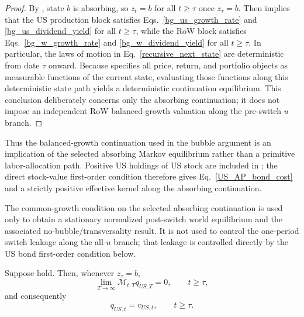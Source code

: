 \documentclass{article}
\def\green#1{#1}%
\begin{document}
\begin{proof}
By , state $b$ is absorbing, so $z_t=b$ for all $t\ge \tau$ once $z_\tau=b$. Then  implies that the US production block satisfies Eqs.~\eqref{bg_us_growth_rate} and \eqref{bg_us_dividend_yield} for all $t\ge \tau$, while the RoW block satisfies Eqs.~\eqref{bg_w_growth_rate} and \eqref{bg_w_dividend_yield} for all $t\ge \tau$. In particular, the laws of motion in Eq.~\eqref{recursive_next_state} are deterministic from date $\tau$ onward. Because  specifies all price, return, and portfolio objects as measurable functions of the current state, evaluating those functions along this deterministic state path yields a deterministic continuation equilibrium. This conclusion deliberately concerns only the absorbing continuation; it does not impose an independent RoW balanced-growth valuation along the pre-switch $u$ branch.
\end{proof}

Thus the balanced-growth continuation used in the bubble argument is an implication of the selected absorbing Markov equilibrium rather than a primitive labor-allocation path.  \green{Positive US holdings of US stock} are \green{included in }; the \green{direct stock-value first-order condition therefore gives} Eq.~\green{\eqref{US_AP_bond_cost} and a strictly positive effective} kernel along the absorbing continuation.

\green{The common-growth condition on the selected absorbing continuation is used only to obtain a stationary normalized post-switch world equilibrium and the associated no-bubble/transversality result}.  \green{It is not used to control the one-period switch leakage along the all-}$\green{u}$ \green{branch}; \green{that leakage is controlled directly by the US bond first-order condition below}.

\begin{prop}\label{prop_no_bubble_absorbing_branch}\label{prop1}
Suppose \green{} hold. Then, whenever $z_\tau=b$,
\[
\lim_{T\to\infty}\mathcal M_{t,T}q_{US,T}=0,
\qquad
t\ge \tau,
\]
and consequently
\[
q_{US,t}=v_{US,t},
\qquad
t\ge \tau.
\]
\end{prop}
\end{document}
